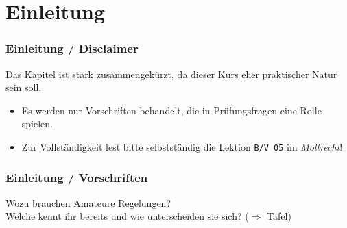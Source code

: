

\subtitle{Betriebstechnik/Vorschriften 05:  \\
          Gesetze, Vorschriften, Regelungen \\[2em]}
\date{Stand 05.11.2015}



\section{Einleitung}

\begin{frame}
    \frametitle{Einleitung / Disclaimer}

    \begin{center}
        \Large{Das Kapitel ist stark zusammengekürzt, da dieser Kurs eher
        praktischer Natur sein soll.}
    \end{center}

    \normalsize

    \begin{itemize}
        \item Es werden nur Vorschriften behandelt, die in Prüfungsfragen eine Rolle spielen.
        \item Zur Vollständigkeit lest bitte selbstständig die Lektion \texttt{B/V 05} im
        \emph{Moltrecht}!
    \end{itemize}

\end{frame}


\begin{frame}
    \frametitle{Einleitung / Vorschriften}

    \begin{center}
        \Large{Wozu brauchen Amateure Regelungen?} \\
        \Large{Welche kennt ihr bereits und wie unterscheiden sie sich? ($\Rightarrow$ Tafel)}
    \end{center}

\end{frame}

